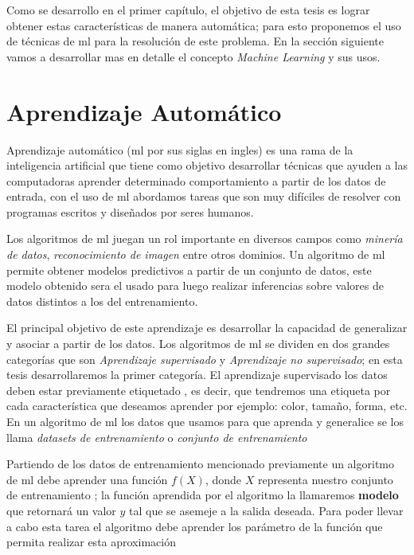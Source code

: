 Como se desarrollo en el primer capítulo, el objetivo de esta tesis es lograr obtener estas características de manera automática; para esto proponemos el uso de técnicas de \ac{ml} para la resolución de este problema. En la sección siguiente vamos a desarrollar mas en detalle  el concepto \textit{Machine Learning} y sus usos.




\section{Aprendizaje Automático}\label{sec:machinelaerning}

Aprendizaje automático (\ac{ml} por sus siglas en ingles) es una rama de la inteligencia artificial que tiene como objetivo desarrollar técnicas que ayuden a las computadoras aprender determinado comportamiento a partir de los datos de entrada, con el uso de \ac{ml} abordamos tareas que son muy difíciles de resolver con programas escritos y diseñados por seres humanos.

Los algoritmos de \ac{ml} juegan un rol importante en diversos campos como \textit{minería de datos}, \textit{reconocimiento de imagen} entre otros dominios. Un algoritmo de  \ac{ml} permite obtener modelos predictivos a partir de un conjunto de datos, este modelo obtenido sera el usado para luego realizar inferencias sobre valores de datos distintos a los del entrenamiento.

El principal objetivo de este aprendizaje es desarrollar la capacidad de generalizar y asociar a partir de los datos. Los algoritmos de  \ac{ml} se dividen en dos grandes categorías que son \textit{Aprendizaje supervisado} y \textit{Aprendizaje no supervisado};  en esta tesis desarrollaremos la primer categoría.  El aprendizaje supervisado los datos deben estar previamente etiquetado , es decir, que tendremos una etiqueta por cada característica que deseamos aprender por ejemplo: color, tamaño, forma, etc. En un algoritmo de \ac{ml} los datos que usamos para que aprenda y generalice se los llama \textit{datasets de entrenamiento} o \textit{conjunto de entrenamiento}

Partiendo de los datos de entrenamiento mencionado previamente un algoritmo de \ac{ml} debe aprender una función  $ f(X)$, donde $ X$ representa nuestro conjunto de entrenamiento ; la función aprendida por el algoritmo la llamaremos \textbf{modelo}  que retornará un valor $ y$ tal que se asemeje a la salida deseada. Para poder llevar a cabo esta tarea el algoritmo debe aprender los parámetro de la función que permita realizar esta aproximación 

